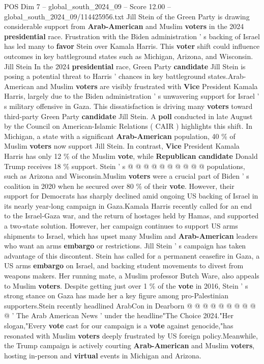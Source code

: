 \begin{textsample}{POS Dim 7 – global\_south\_2024\_09 – Score 12.00 – global\_south\_2024\_09/114425956.txt}  \label{ex:f7_pos_227}
Jill Stein of the Green Party is drawing considerable support from \textbf{Arab-American} and Muslim \textbf{voters} in the 2024 \textbf{presidential} race.
Frustration with the Biden administration ' s backing of Israel has led many to \textbf{favor} Stein over Kamala Harris.
This \textbf{voter} shift could influence outcomes in key battleground states such as Michigan, Arizona, and Wisconsin.
Jill Stein In the 2024 \textbf{presidential} race, Green Party \textbf{candidate} Jill Stein is posing a potential threat to Harris ' chances in key battleground states.Arab-American and Muslim \textbf{voters} are visibly frustrated with \textbf{Vice} President Kamala Harris, largely due to the Biden administration ' s unwavering support for Israel ' s military offensive in Gaza.
This dissatisfaction is driving many \textbf{voters} toward third-party Green Party \textbf{candidate} Jill Stein.
A \textbf{poll} conducted in late August by the Council on American-Islamic Relations ( CAIR ) highlights this shift.
In Michigan, a state with a significant \textbf{Arab-American} population, 40 \% of Muslim \textbf{voters} now support Jill Stein.
In contrast, \textbf{Vice} President Kamala Harris has only 12 \% of the Muslim \textbf{vote}, while \textbf{Republican} \textbf{candidate} Donald Trump receives 18 \% support.
Stein ' s @ @ @ @ @ @ @ @ @ @ populations, such as Arizona and Wisconsin.Muslim \textbf{voters} were a crucial part of Biden ' s coalition in 2020 when he secured over 80 \% of their \textbf{vote}.
However, their support for Democrats has sharply declined amid ongoing US backing of Israel in its nearly year-long campaign in Gaza.Kamala Harris recently called for an end to the Israel-Gaza war, and the return of hostages held by Hamas, and supported a two-state solution.
However, her campaign continues to support US arms shipments to Israel, which has upset many Muslim and \textbf{Arab-American} leaders who want an arms \textbf{embargo} or restrictions.
Jill Stein ' s campaign has taken advantage of this discontent.
Stein has called for a permanent ceasefire in Gaza, a US arms \textbf{embargo} on Israel, and backing student movements to divest from weapons makers.
Her running mate, a Muslim professor Butch Ware, also appeals to Muslim \textbf{voters}.
Despite getting just over 1 \% of the \textbf{vote} in 2016, Stein ' s strong stance on Gaza has made her a key figure among pro-Palestinian supporters.Stein recently headlined ArabCon in Dearborn @ @ @ @ @ @ @ @ @ @ ' The Arab American News ' under the headline"The Choice 2024."Her slogan,"Every \textbf{vote} cast for our campaign is a \textbf{vote} against genocide,"has resonated with Muslim \textbf{voters} deeply frustrated by US foreign policy.Meanwhile, the Trump campaign is actively courting \textbf{Arab-American} and Muslim \textbf{voters}, hosting in-person and \textbf{virtual} events in Michigan and Arizona.

\end{textsample}
